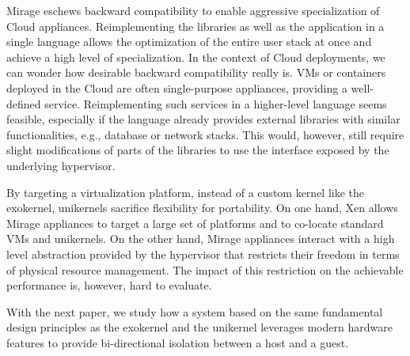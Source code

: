 Mirage eschews backward compatibility to enable aggressive specialization of Cloud appliances.
Reimplementing the libraries as well as the application in a single language allows the optimization of the entire user stack at once and achieve a high level of specialization.
In the context of Cloud deployments, we can wonder how desirable backward compatibility really is.
VMs or containers deployed in the Cloud are often single-purpose appliances, providing a well-defined service.
Reimplementing such services in a higher-level language seems feasible, especially if the language already provides external libraries with similar functionalities, e.g., database or network stacks.
This would, however, still require slight modifications of parts of the libraries to use the interface exposed by the underlying hypervisor.

By targeting a virtualization platform, instead of a custom kernel like the exokernel, unikernels sacrifice flexibility for portability.
On one hand, Xen allows Mirage appliances to target a large set of platforms and to co-locate standard VMs and unikernels.
On the other hand, Mirage appliances interact with a high level abstraction provided by the hypervisor that restricts their freedom in terms of physical resource management.
The impact of this restriction on the achievable performance is, however, hard to evaluate.

With the next paper, we study how a system based on the same fundamental design principles as the exokernel and the unikernel leverages modern hardware features to provide bi-directional isolation between a host and a guest.


